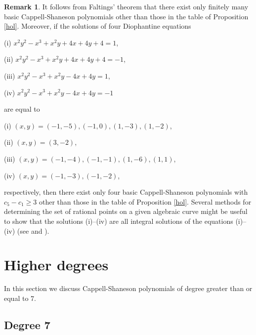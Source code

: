 \documentclass{amsart}
\theoremstyle{plain}
\theoremstyle{definition}
\newtheorem{rem}[thm]{Remark}
\theoremstyle{remark}
\begin{document}
\begin{rem}
It follows from Faltings' theorem \cite{Faltings1983} 
that there exist only finitely many basic Cappell-Shaneson polynomials 
other than those in the table of Proposition \ref{hol}. 
Moreover, if the solutions of four Diophantine equations 

(i) $x^2y^2-x^3+x^2y+4x+4y+4=1$, 

(ii) $x^2y^2-x^3+x^2y+4x+4y+4=-1$, 

(iii) $x^2y^2-x^3+x^2y-4x+4y=1$, 

(iv) $x^2y^2-x^3+x^2y-4x+4y=-1$ 

\noindent
are equal to 

(i) $(x,y)=(-1,-5), (-1,0), (1,-3), (1,-2)$, 

(ii) $(x,y)=(3,-2)$, 

(iii) $(x,y)=(-1,-4), (-1,-1), (1,-6), (1,1)$, 

(iv) $(x,y)=(-1,-3), (-1,-2)$, 

\noindent
respectively, then there exist only four basic Cappell-Shaneson polynomials with $c_5-c_1\geq 3$ 
other than those in the table of Proposition \ref{hol}. 
Several methods 
for determining the set of rational points on a given algebraic curve might be useful 
to show that the solutions (i)--(iv) are all integral solutions of the equations (i)--(iv) 
(see \cite{BPS2016} and \cite{BMSST2008}). 
\end{rem}




\section{Higher degrees}


In this section we discuss Cappell-Shaneson polynomials of degree greater than or equal to $7$. 

\subsection{Degree $\boldsymbol{7}$}
\end{document}
